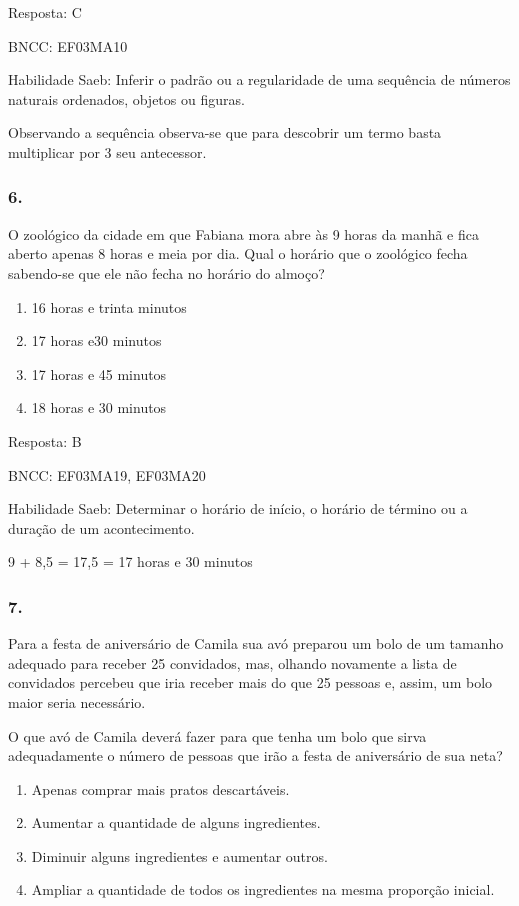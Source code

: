 Resposta: C

BNCC: EF03MA10

Habilidade Saeb: Inferir o padrão ou a regularidade de uma sequência de
números naturais ordenados, objetos ou figuras.

Observando a sequência observa-se que para descobrir um termo basta
multiplicar por 3 seu antecessor.

\subsubsection{6.}\label{section-161}

O zoológico da cidade em que Fabiana mora abre às 9 horas da manhã e
fica aberto apenas 8 horas e meia por dia. Qual o horário que o
zoológico fecha sabendo-se que ele não fecha no horário do almoço?

\begin{enumerate}
\def\labelenumi{\alph{enumi})}
\item
  16 horas e trinta minutos
\item
  17 horas e30 minutos
\item
  17 horas e 45 minutos
\item
  18 horas e 30 minutos
\end{enumerate}

Resposta: B

BNCC: EF03MA19, EF03MA20

Habilidade Saeb: Determinar o horário de início, o horário de término ou
a duração de um acontecimento.

9 + 8,5 = 17,5 = 17 horas e 30 minutos

\subsubsection{7. }\label{section-162}

Para a festa de aniversário de Camila sua avó preparou um bolo de um
tamanho adequado para receber 25 convidados, mas, olhando novamente a
lista de convidados percebeu que iria receber mais do que 25 pessoas e,
assim, um bolo maior seria necessário.

O que avó de Camila deverá fazer para que tenha um bolo que sirva
adequadamente o número de pessoas que irão a festa de aniversário de sua
neta?

\begin{enumerate}
\def\labelenumi{\alph{enumi})}
\item
  Apenas comprar mais pratos descartáveis.
\item
  Aumentar a quantidade de alguns ingredientes.
\item
  Diminuir alguns ingredientes e aumentar outros.
\item
  Ampliar a quantidade de todos os ingredientes na mesma proporção
  inicial.
\end{enumerate}

